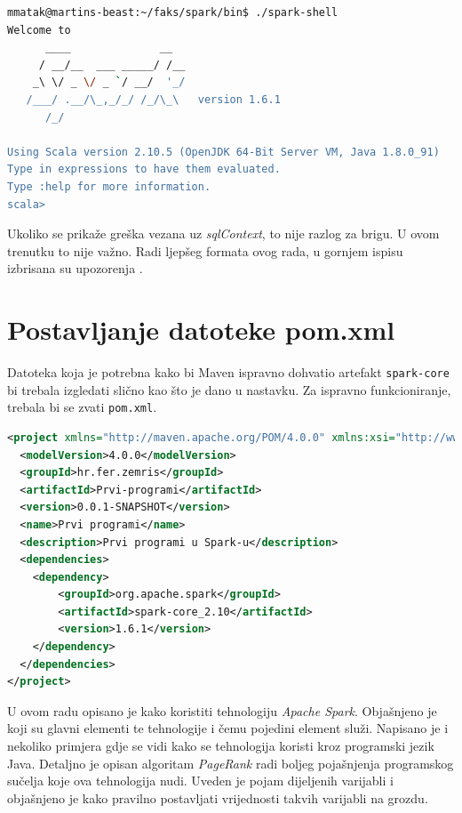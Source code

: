 \documentclass[times, utf8, zavrsni, numeric]{fer}
\begin{document}
\begin{appendices}
\begin{lstlisting}[language=bash]
mmatak@martins-beast:~/faks/spark/bin$ ./spark-shell
Welcome to
      ____              __
     / __/__  ___ _____/ /__
    _\ \/ _ \/ _ `/ __/  '_/
   /___/ .__/\_,_/_/ /_/\_\   version 1.6.1
      /_/

Using Scala version 2.10.5 (OpenJDK 64-Bit Server VM, Java 1.8.0_91)
Type in expressions to have them evaluated.
Type :help for more information.
scala>
\end{lstlisting}


Ukoliko se prikaže greška vezana uz \emph{sqlContext}, to nije razlog za brigu. U ovom trenutku to nije važno. Radi ljepšeg formata ovog rada, u gornjem ispisu izbrisana su upozorenja .
\chapter{Postavljanje datoteke pom.xml}
\label{ch:datotekapomXML}
Datoteka koja je potrebna kako bi Maven ispravno dohvatio artefakt \texttt{spark-core} bi trebala izgledati slično kao što je dano u nastavku. Za ispravno funkcioniranje, trebala bi se zvati \texttt{pom.xml}.
\begin{lstlisting}[language=XML]
<project xmlns="http://maven.apache.org/POM/4.0.0" xmlns:xsi="http://www.w3.org/2001/XMLSchema-instance" xsi:schemaLocation="http://maven.apache.org/POM/4.0.0 http://maven.apache.org/xsd/maven-4.0.0.xsd">
  <modelVersion>4.0.0</modelVersion>
  <groupId>hr.fer.zemris</groupId>
  <artifactId>Prvi-programi</artifactId>
  <version>0.0.1-SNAPSHOT</version>
  <name>Prvi programi</name>
  <description>Prvi programi u Spark-u</description>
  <dependencies>
  	<dependency>
  		<groupId>org.apache.spark</groupId>
  		<artifactId>spark-core_2.10</artifactId>
  		<version>1.6.1</version>
  	</dependency>
  </dependencies>
</project>
\end{lstlisting}
\end{appendices}

\begin{sazetak}
U ovom radu opisano je kako koristiti tehnologiju \emph{Apache Spark}. Objašnjeno je koji su glavni elementi te tehnologije i čemu pojedini element služi. Napisano je i nekoliko primjera gdje se vidi kako se tehnologija koristi kroz programski jezik Java. Detaljno je opisan algoritam \emph{PageRank} radi boljeg pojašnjenja programskog sučelja koje ova tehnologija nudi. Uveden je pojam dijeljenih varijabli i objašnjeno je kako pravilno postavljati vrijednosti takvih varijabli na grozdu.

\end{sazetak}
\end{document}
